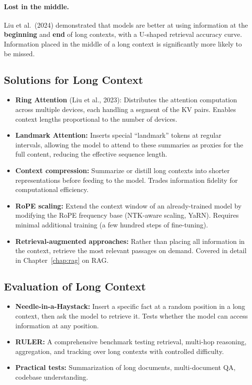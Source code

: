 \paragraph{Lost in the middle.}
Liu et al.\ (2024) demonstrated that models are better at using information
at the \textbf{beginning} and \textbf{end} of long contexts, with a U-shaped
retrieval accuracy curve.  Information placed in the middle of a long context
is significantly more likely to be missed.

\subsection{Solutions for Long Context}

\begin{itemize}[leftmargin=*]
\item \textbf{Ring Attention} (Liu et al., 2023): Distributes the attention
  computation across multiple devices, each handling a segment of the KV
  pairs.  Enables context lengths proportional to the number of devices.

\item \textbf{Landmark Attention:} Inserts special ``landmark'' tokens at
  regular intervals, allowing the model to attend to these summaries as
  proxies for the full content, reducing the effective sequence length.

\item \textbf{Context compression:} Summarize or distill long contexts into
  shorter representations before feeding to the model.  Trades information
  fidelity for computational efficiency.

\item \textbf{RoPE scaling:} Extend the context window of an already-trained
  model by modifying the RoPE frequency base (NTK-aware scaling, YaRN).
  Requires minimal additional training (a few hundred steps of fine-tuning).

\item \textbf{Retrieval-augmented approaches:} Rather than placing all
  information in the context, retrieve the most relevant passages on demand.
  Covered in detail in Chapter~\ref{chap:rag} on RAG.
\end{itemize}

\subsection{Evaluation of Long Context}

\begin{itemize}[leftmargin=*]
\item \textbf{Needle-in-a-Haystack:} Insert a specific fact at a random
  position in a long context, then ask the model to retrieve it.  Tests
  whether the model can access information at any position.
\item \textbf{RULER:} A comprehensive benchmark testing retrieval, multi-hop
  reasoning, aggregation, and tracking over long contexts with controlled
  difficulty.
\item \textbf{Practical tests:} Summarization of long documents, multi-document
  QA, codebase understanding.
\end{itemize}


